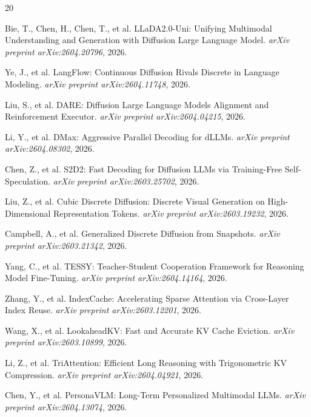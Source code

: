 \documentclass[11pt]{article}
\begin{document}
\begin{thebibliography}{20}

Bie, T., Chen, H., Chen, T., et al.
\newblock LLaDA2.0-Uni: Unifying Multimodal Understanding and Generation with Diffusion Large Language Model.
\newblock \emph{arXiv preprint arXiv:2604.20796}, 2026.

Ye, J., et al.
\newblock LangFlow: Continuous Diffusion Rivals Discrete in Language Modeling.
\newblock \emph{arXiv preprint arXiv:2604.11748}, 2026.

Liu, S., et al.
\newblock DARE: Diffusion Large Language Models Alignment and Reinforcement Executor.
\newblock \emph{arXiv preprint arXiv:2604.04215}, 2026.

Li, Y., et al.
\newblock DMax: Aggressive Parallel Decoding for dLLMs.
\newblock \emph{arXiv preprint arXiv:2604.08302}, 2026.

Chen, Z., et al.
\newblock S2D2: Fast Decoding for Diffusion LLMs via Training-Free Self-Speculation.
\newblock \emph{arXiv preprint arXiv:2603.25702}, 2026.

Liu, Z., et al.
\newblock Cubic Discrete Diffusion: Discrete Visual Generation on High-Dimensional Representation Tokens.
\newblock \emph{arXiv preprint arXiv:2603.19232}, 2026.

Campbell, A., et al.
\newblock Generalized Discrete Diffusion from Snapshots.
\newblock \emph{arXiv preprint arXiv:2603.21342}, 2026.

Yang, C., et al.
\newblock TESSY: Teacher-Student Cooperation Framework for Reasoning Model Fine-Tuning.
\newblock \emph{arXiv preprint arXiv:2604.14164}, 2026.

Zhang, Y., et al.
\newblock IndexCache: Accelerating Sparse Attention via Cross-Layer Index Reuse.
\newblock \emph{arXiv preprint arXiv:2603.12201}, 2026.

Wang, X., et al.
\newblock LookaheadKV: Fast and Accurate KV Cache Eviction.
\newblock \emph{arXiv preprint arXiv:2603.10899}, 2026.

Li, Z., et al.
\newblock TriAttention: Efficient Long Reasoning with Trigonometric KV Compression.
\newblock \emph{arXiv preprint arXiv:2604.04921}, 2026.

Chen, Y., et al.
\newblock PersonaVLM: Long-Term Personalized Multimodal LLMs.
\newblock \emph{arXiv preprint arXiv:2604.13074}, 2026.


\end{thebibliography}
\end{document}
